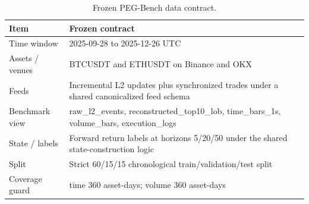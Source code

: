 \begin{table}[t]
\centering
\caption{Frozen PEG-Bench data contract.}
\label{tab:table_08_frozen_data_contract}
\begin{tabular}{ll}
\toprule
Item & Frozen contract \\
\midrule
Time window & 2025-09-28 to 2025-12-26 UTC \\
Assets / venues & BTCUSDT and ETHUSDT on Binance and OKX \\
Feeds & Incremental L2 updates plus synchronized trades under a shared canonicalized feed schema \\
Benchmark view & raw\_l2\_events, reconstructed\_top10\_lob, time\_bars\_1s, volume\_bars, execution\_logs \\
State / labels & Forward return labels at horizons 5/20/50 under the shared state-construction logic \\
Split & Strict 60/15/15 chronological train/validation/test split \\
Coverage guard & time 360 asset-days; volume 360 asset-days \\
\bottomrule
\end{tabular}
\end{table}
